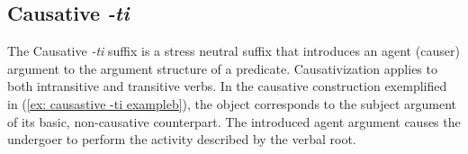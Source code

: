     \label{ex: applicative -wi examplea}
        \label{ex: applicative -wi exampleb}
    \z
\z

\subsection{Causative \textit{-ti}}
\label{subsec: causative}

The Causative \textit{-ti} suffix is a stress neutral suffix that introduces an agent (causer) argument to the argument structure of a predicate. Causativization applies to both intransitive and transitive verbs. In the causative construction exemplified in (\ref{ex: causastive -ti exampleb}), the object corresponds to the subject argument of its basic, non-causative counterpart. The introduced agent argument causes the undergoer to perform the activity described by the verbal root.

\ea\label{ex: causastive -ti example}

